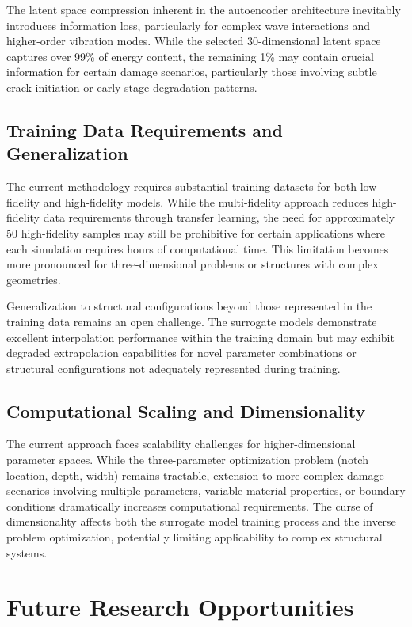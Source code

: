 The latent space compression inherent in the autoencoder architecture inevitably introduces information loss, particularly for complex wave interactions and higher-order vibration modes. While the selected 30-dimensional latent space captures over 99\% of energy content, the remaining 1\% may contain crucial information for certain damage scenarios, particularly those involving subtle crack initiation or early-stage degradation patterns.

\subsection{Training Data Requirements and Generalization}
The current methodology requires substantial training datasets for both low-fidelity and high-fidelity models. While the multi-fidelity approach reduces high-fidelity data requirements through transfer learning, the need for approximately 50 high-fidelity samples may still be prohibitive for certain applications where each simulation requires hours of computational time. This limitation becomes more pronounced for three-dimensional problems or structures with complex geometries.

Generalization to structural configurations beyond those represented in the training data remains an open challenge. The surrogate models demonstrate excellent interpolation performance within the training domain but may exhibit degraded extrapolation capabilities for novel parameter combinations or structural configurations not adequately represented during training.

\subsection{Computational Scaling and Dimensionality}
The current approach faces scalability challenges for higher-dimensional parameter spaces. While the three-parameter optimization problem (notch location, depth, width) remains tractable, extension to more complex damage scenarios involving multiple parameters, variable material properties, or boundary conditions dramatically increases computational requirements. The curse of dimensionality affects both the surrogate model training process and the inverse problem optimization, potentially limiting applicability to complex structural systems.

\section{Future Research Opportunities}
